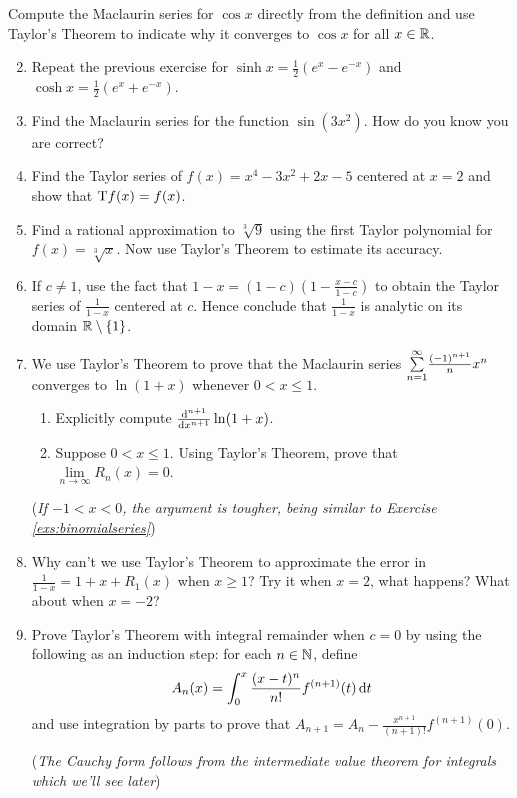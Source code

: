 \begin{exercises}
	\exstart Compute the Maclaurin series for $\cos x$ directly from the definition and use Taylor's Theorem to indicate why it converges to $\cos x$ for all $x\in \R$.
	\begin{enumerate}\setcounter{enumi}{1}
	  \item Repeat the previous exercise for $\sinh x=\frac 12(e^x-e^{-x})$ and $\cosh x=\frac 12(e^x+e^{-x})$.
	  
	  
	  \item Find the Maclaurin series for the function $\sin(3x^2)$. How do you know you are correct?
	  
	  
	  \item Find the Taylor series of $f(x)=x^4-3x^2+2x-5$ centered at $x=2$ and show that $\rT f(x)=f(x)$.
	  
	  
	  \item Find a rational approximation to $\sqrt[3]{9}$ using the first Taylor polynomial for $f(x)=\sqrt[3]{x}$. Now use Taylor's Theorem to estimate its accuracy.
	  
	  
	  \item If $c\neq 1$, use the fact that $1-x=(1-c)\left(1-\frac{x-c}{1-c}\right)$ to obtain the Taylor series of $\frac 1{1-x}$ centered at $c$. Hence conclude that $\frac 1{1-x}$ is analytic on its domain $\R\setminus\{1\}$.
	  
	  
	 	\item We use Taylor's Theorem to prove that the Maclaurin series $\smash[b]{\sum\limits_{n=1}^\infty} \frac{(-1)^{n+1}}nx^n$ converges to $\ln(1+x)$ whenever $0<x\le 1$.
	 	\begin{enumerate}
	 	  \item Explicitly compute $\diff[^{n+1}]{x^{n+1}}\ln(1+x)$. 
	 	  \item Suppose $0<x\le 1$. Using Taylor's Theorem, prove that $\lim\limits_{n\to\infty}R_n(x)=0$.
		\end{enumerate}
		(\emph{If $-1<x<0$, the argument is tougher, being similar to Exercise \ref{exs:binomialseries}})
		
		
		\item Why can't we use Taylor's Theorem to approximate the error in $\frac 1{1-x}=1+x+R_1(x)$ when $x\ge 1$? Try it when $x=2$, what happens? What about when $x=-2$?
	 	
	 	
		\item Prove Taylor's Theorem with integral remainder when $c=0$ by using the following as an induction step: for each $n\in\N$, define
	 	\[
	 		A_n(x)=\int_0^x\frac{(x-t)^n}{n!}f^{(n+1)}(t)\,\dt
	 	\]
	 	and use integration by parts to prove that $A_{n+1}=A_n-\frac{x^{n+1}}{(n+1)!}f^{(n+1)}(0)$.\par
	 	(\emph{The Cauchy form follows from the intermediate value theorem for integrals which we'll see later})
	 	

\end{enumerate}
\end{exercises}
